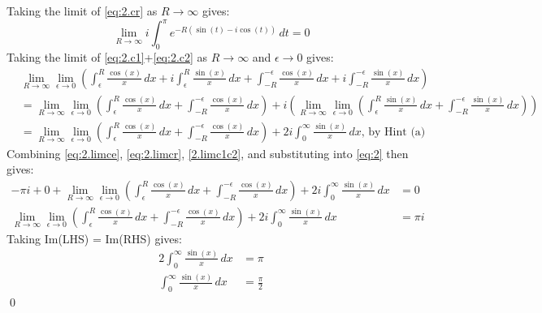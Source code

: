 \documentclass[a4paper, titlepage, DIV=14]{scrartcl}
\begin{document}
    Taking the limit of \eqref{eq:2.cr} as $R\to\infty$ gives:
    \begin{equation}
        \lim_{R\to\infty} i\int_{0}^{\pi}e^{-R(\sin(t)-i\cos(t))} \, dt = 0 \label{eq:2.limcr}
    \end{equation}
    Taking the limit of \eqref{eq:2.c1}+\eqref{eq:2.c2} as $R\to\infty$ and $\epsilon\to0$ gives:
    \begin{align}
        &\lim_{R\to\infty}\lim_{\epsilon\to0} (\int_{\epsilon}^{R} \frac{\cos(x)}{x} \, dx + i\int_{\epsilon}^{R} \frac{\sin(x)}{x} \, dx + \int_{-R}^{-\epsilon} \frac{\cos(x)}{x} \, dx + i\int_{-R}^{-\epsilon} \frac{\sin(x)}{x} \, dx) \nonumber\\
        &= \lim_{R\to\infty}\lim_{\epsilon\to0}(\int_{\epsilon}^{R} \frac{\cos(x)}{x} \, dx + \int_{-R}^{-\epsilon} \frac{\cos(x)}{x} \, dx) + i (\lim_{R\to\infty}\lim_{\epsilon\to0}(\int_{\epsilon}^{R} \frac{\sin(x)}{x} \, dx + \int_{-R}^{-\epsilon} \frac{\sin(x)}{x} \, dx)) \nonumber\\
        &= \lim_{R\to\infty}\lim_{\epsilon\to0}(\int_{\epsilon}^{R} \frac{\cos(x)}{x} \, dx + \int_{-R}^{-\epsilon} \frac{\cos(x)}{x} \, dx) + 2i\int_{0}^{\infty}\frac{\sin(x)}{x}\, dx, \, \text{by Hint (a)} \label{2.limc1c2}
    \end{align}
    Combining \eqref{eq:2.limce}, \eqref{eq:2.limcr}, \eqref{2.limc1c2}, and substituting into \eqref{eq:2} then gives:
    \begin{align*}
        -\pi i + 0 + \lim_{R\to\infty}\lim_{\epsilon\to0}(\int_{\epsilon}^{R} \frac{\cos(x)}{x} \, dx + \int_{-R}^{-\epsilon} \frac{\cos(x)}{x} \, dx) + 2i\int_{0}^{\infty}\frac{\sin(x)}{x}\, dx &= 0 \\
        \lim_{R\to\infty}\lim_{\epsilon\to0}(\int_{\epsilon}^{R} \frac{\cos(x)}{x} \, dx + \int_{-R}^{-\epsilon} \frac{\cos(x)}{x} \, dx) + 2i\int_{0}^{\infty}\frac{\sin(x)}{x}\, dx &= \pi i
    \end{align*}
    Taking Im(LHS) = Im(RHS) gives:
    \begin{align*}
        2\int_{0}^{\infty}\frac{\sin(x)}{x}\, dx &= \pi \\
        \int_{0}^{\infty}\frac{\sin(x)}{x}\, dx &= \frac{\pi}{2} 
    \end{align*} \qed
    
\end{document}
